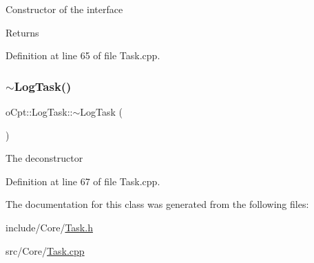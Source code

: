 Constructor of the interface \begin{DoxyReturn}{Returns}

\end{DoxyReturn}


Definition at line 65 of file Task.\+cpp.

\hypertarget{classo_cpt_1_1_log_task_a0f80363644cbe0a9c17e78198d466788}{}\label{classo_cpt_1_1_log_task_a0f80363644cbe0a9c17e78198d466788} 
\subsubsection{\texorpdfstring{$\sim$\+Log\+Task()}{~LogTask()}}
{\footnotesize\ttfamily o\+Cpt\+::\+Log\+Task\+::$\sim$\+Log\+Task (\begin{DoxyParamCaption}{ }\end{DoxyParamCaption})\hspace{0.3cm}{\ttfamily [virtual]}}

The deconstructor 

Definition at line 67 of file Task.\+cpp.



The documentation for this class was generated from the following files\+:\begin{DoxyCompactItemize}
\item 
include/\+Core/\hyperlink{_task_8h}{Task.\+h}\item 
src/\+Core/\hyperlink{_task_8cpp}{Task.\+cpp}\end{DoxyCompactItemize}
